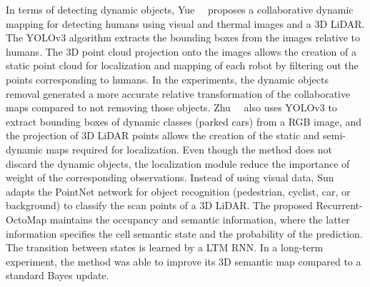 In terms of detecting dynamic objects, Yue~\etal~\cite{yue-et-al:2020:9197072} proposes a collaborative dynamic mapping for detecting humans using visual and thermal images and a 3D \gls{LiDAR}. The YOLOv3 algorithm extracts the bounding boxes from the images relative to humans. The 3D point cloud projection onto the images allows the creation of a static point cloud for localization and mapping of each robot by filtering out the points corresponding to humans. In the experiments, the dynamic objects removal generated a more accurate relative transformation of the collaborative maps compared to not removing those objects.
Zhu~\etal~\cite{zhu-et-al:2021:9561584} also uses YOLOv3 to extract bounding boxes of dynamic classes (parked cars) from a RGB image, and the projection of 3D \gls{LiDAR} points allows the creation of the static and semi-dynamic maps required for localization. Even though the method \cite{zhu-et-al:2021:9561584} does not discard the dynamic objects, the localization module reduce the importance of weight of the corresponding observations.
Instead of using visual data, Sun~\etal~\cite{sun-et-al:2018:2856268} adapts the PointNet network for object recognition (pedestrian, cyclist, car, or background) to classify the scan points of a 3D \gls{LiDAR}. The proposed Recurrent-OctoMap maintains the occupancy and semantic information, where the latter information specifies the cell semantic state and the probability of the prediction. The transition between states is learned by a \gls{LTM} \gls{RNN}. In a long-term experiment, the method \cite{sun-et-al:2018:2856268} was able to improve its 3D semantic map compared to a standard Bayes update.

